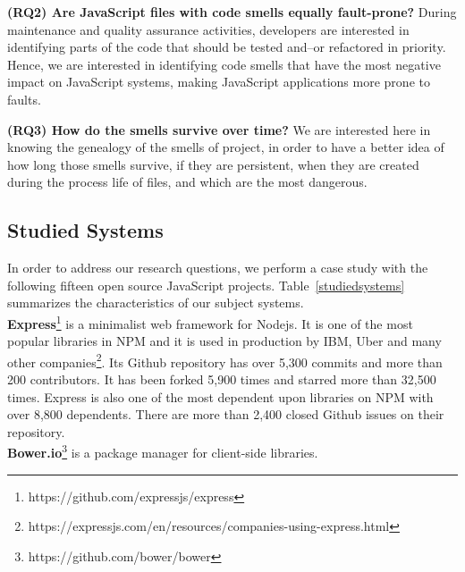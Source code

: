 \textbf{(RQ2) Are JavaScript files with code smells equally fault-prone?}
During maintenance and quality assurance activities, developers are interested in identifying parts of the code that should be tested and--or refactored in priority. Hence, we are interested in identifying code smells that have the most negative impact on JavaScript systems, \ie{} making JavaScript applications more prone to faults.

{\color{blue}\textbf{(RQ3) How do the smells survive over time?}
We are interested here in knowing the genealogy of the smells of project, in order to have a better idea of how long those smells survive, if they are persistent, when they are created during the process life of files, and which are the most dangerous.
}

\subsection{Studied Systems}
In order to address our research questions, we perform a case study with the following {\color{blue}fifteen} open source JavaScript projects. Table~\ref{studiedsystems} summarizes the characteristics of our subject systems.\\
\textbf{Express}\footnote{https://github.com/expressjs/express} is a minimalist web framework for Nodejs. It is one of the most popular libraries in NPM \cite{mardan2014express} and it is used in production by IBM, Uber and many other companies\footnote{https://expressjs.com/en/resources/companies-using-express.html}. Its Github repository has over 5,300 commits and more than 200 contributors. It has been forked 5,900 times and starred more than 32,500 times. Express is also one of the most dependent upon libraries on NPM with over 8,800 dependents. There are more than 2,400 closed Github issues on their repository.\\
\textbf{Bower.io}\footnote{https://github.com/bower/bower} is a package manager for client-side libraries.
